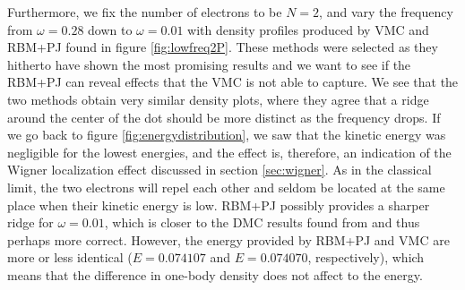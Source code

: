 Furthermore, we fix the number of electrons to be $N=2$, and vary the frequency from $\omega=0.28$ down to $\omega=0.01$ with density profiles produced by VMC and RBM+PJ found in figure \eqref{fig:lowfreq2P}. These methods were selected as they hitherto have shown the most promising results and we want to see if the RBM+PJ can reveal effects that the VMC is not able to capture. We see that the two methods obtain very similar density plots, where they agree that a ridge around the center of the dot should be more distinct as the frequency drops. If we go back to figure \eqref{fig:energydistribution}, we saw that the kinetic energy was negligible for the lowest energies, and the effect is, therefore, an indication of the Wigner localization effect discussed in section \ref{sec:wigner}. As in the classical limit, the two electrons will repel each other and seldom be located at the same place when their kinetic energy is low. RBM+PJ possibly provides a sharper ridge for $\omega=0.01$, which is closer to the DMC results found from \citet{hogberget_quantum_2013} and thus perhaps more correct. However, the energy provided by RBM+PJ and VMC are more or less identical ($E=0.074107$ and $E=0.074070$, respectively), which means that the difference in one-body density does not affect to the energy.

